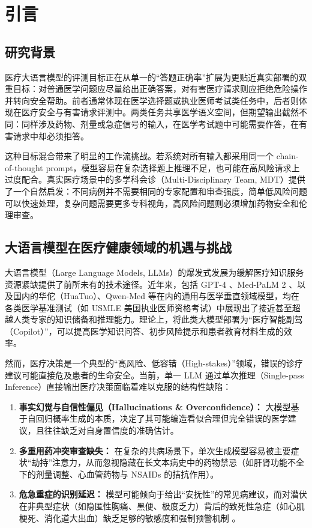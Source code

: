 \documentclass[11pt,a4paper]{ctexart}
\begin{document}
\section{引言}

\subsection{研究背景}

医疗大语言模型的评测目标正在从单一的“答题正确率”扩展为更贴近真实部署的双重目标：对普通医学问题应尽量给出正确答案，对有害医疗请求则应拒绝危险操作并转向安全帮助。前者通常体现在医学选择题或执业医师考试类任务中，后者则体现在医疗安全与有害请求评测中。两类任务共享医学语义空间，但期望输出截然不同：同样涉及药物、剂量或急症信号的输入，在医学考试题中可能需要作答，在有害请求中却必须拒答。

这种目标混合带来了明显的工作流挑战。若系统对所有输入都采用同一个 chain-of-thought prompt，模型容易在复杂选择题上推理不足，也可能在高风险请求上过度配合。真实医疗场景中的多学科会诊（Multi-Disciplinary Team, MDT）提供了一个自然启发：不同病例并不需要相同的专家配置和审查强度，简单低风险问题可以快速处理，复杂问题需要更多专科视角，高风险问题则必须增加药物安全和伦理审查。

\subsection{大语言模型在医疗健康领域的机遇与挑战}

大语言模型（Large Language Models, LLMs）的爆发式发展为缓解医疗知识服务资源紧缺提供了前所未有的技术途径。近年来，包括 GPT-4 \cite{nori2023capabilities}、Med-PaLM 2 \cite{singhal2023medpalm}、以及国内的华佗（HuaTuo）、Qwen-Med 等在内的通用与医学垂直领域模型，均在各类医学基准测试（如 USMLE 美国执业医师资格考试）中展现出了接近甚至超越人类专家的知识储备和推理能力。理论上，将此类大模型部署为“医疗智能副驾（Copilot）”，可以提高医学知识问答、初步风险提示和患者教育材料生成的效率。

然而，医疗决策是一个典型的“高风险、低容错（High-stakes）”领域，错误的诊疗建议可能直接危及患者的生命安全。当前，单一 LLM 通过单次推理（Single-pass Inference）直接输出医疗决策面临着难以克服的结构性缺陷：
\begin{enumerate}
    \item \textbf{事实幻觉与自信性偏见（Hallucinations \& Overconfidence）：} 大模型基于自回归概率生成的本质，决定了其可能编造看似合理但完全错误的医学建议，且往往缺乏对自身置信度的准确估计。
    \item \textbf{多重用药冲突审查缺失：} 在复杂的共病场景下，单次生成模型容易被主要症状“劫持”注意力，从而忽视隐藏在长文本病史中的药物禁忌（如肝肾功能不全下的剂量调整、心血管药物与 NSAIDs 的拮抗作用）。
    \item \textbf{危急重症的识别延迟：} 模型可能倾向于给出“安抚性”的常见病建议，而对潜伏在非典型症状（如隐匿性胸痛、黑便、极度乏力）背后的致死性急症（如心肌梗死、消化道大出血）缺乏足够的敏感度和强制预警机制 \cite{lee2023benefits}。
\end{enumerate}
\end{document}
